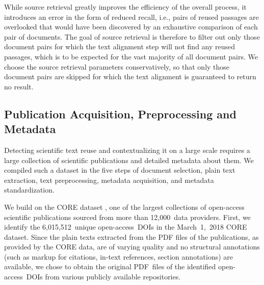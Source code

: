While source retrieval greatly improves the efficiency of the overall process, it introduces an error in the form of reduced recall, i.e., pairs of reused passages are overlooked that would have been discovered by an exhaustive comparison of each pair of documents. The goal of source retrieval is therefore to filter out only those document pairs for which the text alignment step will not find any reused passages, which is to be expected for the vast majority of all document pairs. We choose the source retrieval parameters conservatively, so that only those document pairs are skipped for which the text alignment is guaranteed to return no result.


\subsection*{Publication Acquisition, Preprocessing and Metadata}\label{sub:data}

Detecting scientific text reuse and contextualizing it on a large scale requires a large collection of scientific publications and detailed metadata about them. We compiled such a dataset in the five steps of document selection, plain text extraction, text preprocessing, metadata acquisition, and metadata standardization.

We build on the CORE dataset \cite{knoth:2012}, one of the largest collections of open-access scientific publications sourced from more than 12,000~data providers. First, we identify the 6,015,512~unique open-access~DOIs in the March~1,~2018 CORE dataset. Since the plain texts extracted from the PDF files of the publications, as provided by the CORE data, are of varying quality and no structural annotations (such as markup for citations, in-text references, section annotations) are available, we chose to obtain the original PDF~files of the identified open-access~DOIs from various publicly available repositories.


